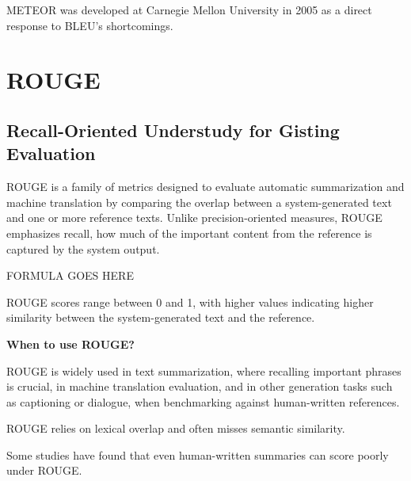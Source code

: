 \clearpage

\thispagestyle{customstyle}

{METEOR was developed at Carnegie Mellon University in 2005 as a direct response to BLEU’s shortcomings.}



\clearpage
\thispagestyle{nlpstyle}
\section{ROUGE}
\subsection{Recall-Oriented Understudy for Gisting Evaluation}

ROUGE is a family of metrics designed to evaluate automatic summarization and machine translation by
comparing the overlap between a system-generated text and one or more reference texts.
Unlike precision-oriented measures, ROUGE emphasizes recall, how much of the important content from
the reference is captured by the system output.

\begin{center}
    FORMULA GOES HERE
\end{center}

ROUGE scores range between 0 and 1, with higher values indicating higher similarity between the
system-generated text and the reference.

\textbf{When to use ROUGE?}

ROUGE is widely used in text summarization, where recalling important phrases is crucial, in machine
translation evaluation, and in other generation tasks such as captioning or dialogue, when
benchmarking against human-written references.

{
\item ROUGE relies on lexical overlap and often misses semantic similarity.
\item Some studies have found that even human-written summaries can score poorly under ROUGE.
}

